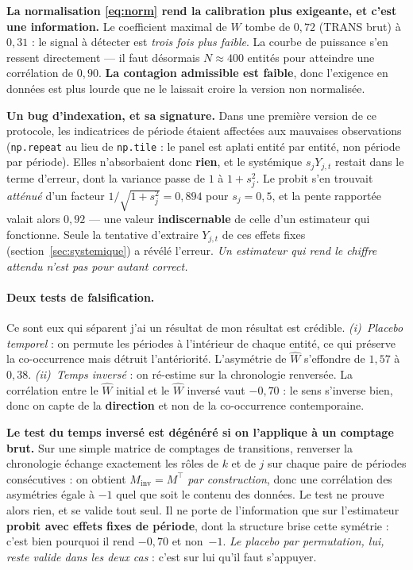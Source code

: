 \documentclass[11pt,a4paper]{article}
\newcommand{\Y}{Y}
\begin{document}
\begin{attention}
\textbf{La normalisation \eqref{eq:norm} rend la calibration plus exigeante, et c'est une
information.} Le coefficient maximal de $W$ tombe de $0{,}72$ (TRANS brut) à $0{,}31$ : le
signal à détecter est \emph{trois fois plus faible}. La courbe de puissance s'en ressent
directement --- il faut désormais $N \approx 400$ entités pour atteindre une corrélation de
$0{,}90$. \textbf{La contagion admissible est faible}, donc l'exigence en données est plus
lourde que ne le laissait croire la version non normalisée.
\end{attention}

\begin{attention}
\textbf{Un bug d'indexation, et sa signature.} Dans une première version de ce protocole, les
indicatrices de période étaient affectées aux mauvaises observations
(\texttt{np.repeat} au lieu de \texttt{np.tile} : le panel est aplati entité par entité, non
période par période). Elles n'absorbaient donc \textbf{rien}, et le systémique $s_j\Y_{j,t}$
restait dans le terme d'erreur, dont la variance passe de $1$ à $1+s_j^2$. Le probit s'en
trouvait \emph{atténué} d'un facteur $1/\sqrt{1+s_j^2} = 0{,}894$ pour $s_j = 0{,}5$, et la
pente rapportée valait alors $0{,}92$ --- une valeur \textbf{indiscernable} de celle d'un
estimateur qui fonctionne. Seule la tentative d'extraire $\Y_{j,t}$ de ces effets fixes
(section~\ref{sec:systemique}) a révélé l'erreur. \emph{Un estimateur qui rend le chiffre
attendu n'est pas pour autant correct.}
\end{attention}

\paragraph{Deux tests de falsification.} Ce sont eux qui séparent \og{}j'ai un résultat\fg{}
de \og{}mon résultat est crédible\fg{}. \emph{(i)~Placebo temporel} : on permute les périodes
à l'intérieur de chaque entité, ce qui préserve la co-occurrence mais détruit l'antériorité.
L'asymétrie de $\hat W$ s'effondre de $1{,}57$ à $0{,}38$. \emph{(ii)~Temps inversé} : on
ré-estime sur la chronologie renversée. La corrélation entre le $\hat W$ initial et le $\hat W$
inversé vaut $-0{,}70$ : le sens s'inverse bien, donc on capte de la \textbf{direction} et non
de la co-occurrence contemporaine.

\begin{attention}
\textbf{Le test du temps inversé est dégénéré si on l'applique à un comptage brut.} Sur une
simple matrice de comptages de transitions, renverser la chronologie échange exactement les
rôles de $k$ et de $j$ sur chaque paire de périodes consécutives : on obtient
$M_{\text{inv}} = M^\top$ \emph{par construction}, donc une corrélation des asymétries
égale à $-1$ quel que soit le contenu des données. Le test ne prouve alors rien, et se valide
tout seul. Il ne porte de l'information que sur l'estimateur \textbf{probit avec effets fixes
de période}, dont la structure brise cette symétrie : c'est bien pourquoi il rend $-0{,}70$
et non~$-1$. \emph{Le placebo par permutation, lui, reste valide dans les deux cas} : c'est
sur lui qu'il faut s'appuyer.
\end{attention}
\end{document}
